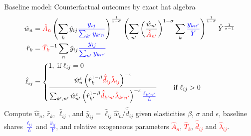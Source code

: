 \documentclass[11pt,notes=hide,aspectratio=169]{beamer}
\begin{document}
\begin{frame}{Baseline model: Counterfactual outcomes by exact hat algebra}
\vspace{-1cm}
\begin{align}
\hat{w}_{n}
&=
\textcolor{red}{\hat{A}_n}
\left(\sum_{k} \hat{y}_{ij}\textcolor{blue}{\frac{y_{ij}}{\sum_{k'} y_{k'n}}}\right)^{\frac{1}{1-\sigma}}
\left(\sum_{n'} \left(\frac{\hat{w}_{n'}}{\textcolor{red}{\hat{A}_{n'}}}\right)^{1-\sigma} \sum_{k} \textcolor{blue}{\frac{y_{kn'}}{Y}} \right)^{\frac{1}{1-\sigma}}
\hat{Y}^{\frac{1}{\sigma-1}}\\
\hat{r}_{k}
&=
\textcolor{red}{\hat{T}_{k}}^{-1} \sum_{n}\hat{y}_{ij}\textcolor{blue}{\frac{y_{ij}}{\sum_{n'}y_{kn'}}}
\\
\hat{\ell}_{ij} 
&=
\left\{
\begin{aligned}
&1, \; \text{if} \; \ell_{ij}=0 \\
&\frac{\hat{w}_{n}^{\varepsilon}\left(\hat{r}_{k}^{1-\beta} \textcolor{red}{\hat{\bar{d}}_{ij}\hat{ \lambda}_{ij}} \right)^{-\varepsilon}}{\sum_{k',n'} \hat{w}_{n'}^{\varepsilon}\left(\hat{r}_{k'}^{1-\beta} \textcolor{red}{\hat{\bar{d}}_{k'n'}\hat{ \lambda}_{k'n'}} \right)^{-\varepsilon} \textcolor{blue}{\frac{\ell_{k'n'}}{L}}} \qquad \text{ if } \ell_{ij} > 0 \\
\end{aligned}
\right.
\end{align}
Compute $\hat{w}_n$, $\hat{r}_k$, $\hat{\ell}_{ij}$, and 
$\hat{y}_{ij} = \hat{\ell}_{ij} \hat{w}_{n} / \hat{\bar{d}}_{ij}$
given 
elasticities $\beta$, $\sigma$ and $\epsilon$, 
baseline shares \textcolor{blue}{$\frac{\ell_{ij}}{L}$}
and \textcolor{blue}{$\frac{y_{ij}}{Y}$},
and
relative exogeneous parameters
\textcolor{red}{$\hat{A}_{n}$}, \textcolor{red}{$\hat{T}_{k}$}, \textcolor{red}{$\hat{\bar{d}}_{ij}$} and \textcolor{red}{$\hat{ \lambda}_{ij}$}.
\hypertarget{appendix:calibratedshares}{}
\end{frame}
\end{document}
